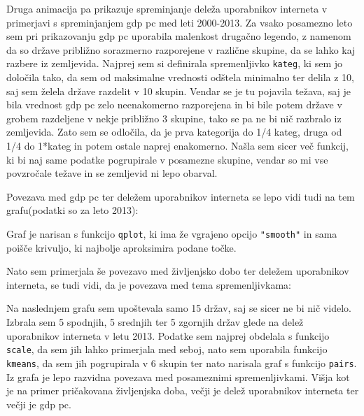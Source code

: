 \documentclass[11pt,a4paper]{article}
\begin{document}
\newpage
Druga animacija pa prikazuje spreminjanje deleža uporabnikov interneta v primerjavi s spreminjanjem gdp pc med leti 2000-2013. Za vsako posamezno leto sem pri prikazovanju gdp pc uporabila malenkost drugačno legendo, z namenom da so države približno sorazmerno razporejene v različne skupine, da se lahko kaj razbere iz zemljevida. Najprej sem si definirala spremenljivko \verb|kateg|, ki sem jo določila tako, da sem od maksimalne vrednosti odštela minimalno ter delila z 10, saj sem želela države razdelit v 10 skupin. Vendar se je tu pojavila težava, saj je bila vrednost gdp pc zelo neenakomerno razporejena in bi bile potem države v grobem razdeljene v nekje približno 3 skupine, tako se pa ne bi nič razbralo iz zemljevida. Zato sem se odločila, da je prva kategorija  do 1/4 kateg, druga od 1/4 do 1*kateg in potem ostale naprej enakomerno. Našla sem sicer več funkcij, ki bi naj same podatke pogrupirale v posamezne skupine, vendar so mi vse povzročale težave in se zemljevid ni lepo obarval.

\begin{center}
\begin{figure}
\end{figure}

\end{center}

\newpage
Povezava med gdp pc ter deležem uporabnikov interneta se lepo vidi tudi na tem grafu(podatki so za leto 2013):
\begin{figure}[h!] 
\begin{center}
 
 \end{center}
\end{figure}

Graf je narisan s funkcijo \verb|qplot|, ki ima že vgrajeno opcijo \verb|"smooth"| in sama poišče krivuljo, ki najbolje aproksimira podane točke.

\newpage
Nato sem primerjala še povezavo med življenjsko dobo ter deležem uporabnikov interneta, se tudi vidi, da je povezava med tema spremenljivkama:
\begin{figure}[h!] 
\begin{center}
 
 \end{center}
\end{figure}

\newpage
Na naslednjem grafu sem upoštevala samo 15 držav, saj se sicer ne bi nič videlo. Izbrala sem 5 spodnjih, 5 srednjih ter 5 zgornjih držav glede na delež uporabnikov interneta v letu 2013.
Podatke sem najprej obdelala s funkcijo \verb|scale|, da sem jih lahko primerjala med seboj, nato sem uporabila funkcijo \verb|kmeans|, da sem jih pogrupirala v 6 skupin ter nato narisala graf s funkcijo \verb|pairs|. Iz grafa je lepo razvidna povezava med posameznimi spremenljivkami. Višja kot je na primer pričakovana življenjska doba, večji je delež uporabnikov interneta ter večji je gdp pc.
\end{document}
